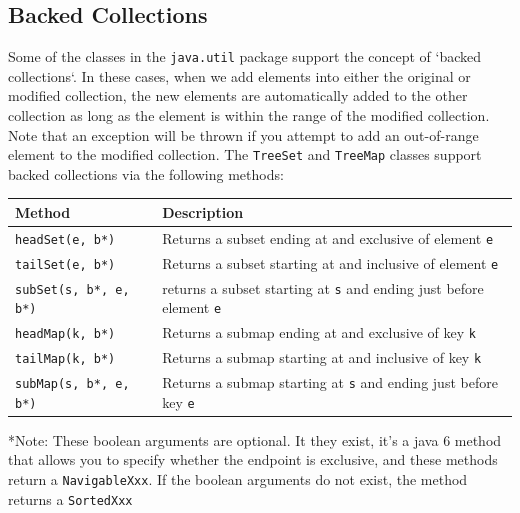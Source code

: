 \subsection{Backed Collections}
Some of the classes in the \verb#java.util# package support the concept of 
`backed collections`. In these cases, when we add elements into either the 
original or modified collection, the new elements are automatically added to 
the other collection as long as the element is within the range of the modified 
collection. Note that an exception will be thrown if you attempt to add an 
out-of-range element to the modified collection. The \verb#TreeSet# and 
\verb#TreeMap# classes support backed collections via the following methods:
\begin{center}
\begin{tabular}{ll}
    \textbf{Method} & \textbf{Description} \\
    \hline
    \verb#headSet(e, b*)# & Returns a subset ending at and exclusive of element 
    \verb#e# \\
    \verb#tailSet(e, b*)# & Returns a subset starting at and inclusive of 
    element \verb#e# \\
    \verb#subSet(s, b*, e, b*)# & returns a subset starting at \verb#s# and 
    ending just before element \verb#e# \\
    \hline
    \verb#headMap(k, b*)# & Returns a submap ending at and exclusive of key 
    \verb#k# \\
    \verb#tailMap(k, b*)# & Returns a submap starting at and inclusive of key 
    \verb#k# \\
    \verb#subMap(s, b*, e, b*)# & Returns a submap starting at \verb#s# and 
    ending just before key \verb#e# \\
\end{tabular}
\end{center}
*Note: These boolean arguments are optional. It they exist, it's a java 6 
method that allows you to specify whether the endpoint is exclusive, and these 
methods return a \verb#NavigableXxx#. If the boolean arguments do not exist, 
the method returns a \verb#SortedXxx#

